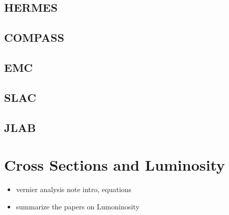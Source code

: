 \subsection{HERMES}
\subsection{COMPASS}
\subsection{EMC}
\subsection{SLAC}
\subsection{JLAB}

\section{Cross Sections and Luminosity}
\begin{itemize}
		\item vernier analysis note intro, equations
		\item summarize the papers on Lumoninosity
\end{itemize}
